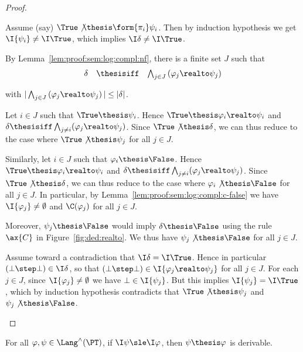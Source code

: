 \begin{proof}
\begin{description}
Assume (say) $\True \not\thesis \form{\pi_i} \psi_i$.
Then by induction hypothesis we get
$\I{\psi_i} \neq \I\True$,
which implies $\I\delta \neq \I\True$.


\item[Case of $\PTbis \arrow \PT$.]
By Lemma~\ref{lem:proof:sem:log:compl:nf},
there is a finite set $J$ such that
\[
\begin{array}{l l l}
  \delta
& \thesisiff
& \bigwedge_{j \in J} \left(\varphi_j \realto \psi_j\right)
\end{array}
\]

\noindent
with
\(
  |\bigwedge_{j \in J} \left(\varphi_j \realto \psi_j\right)|
  \leq
  |\delta|
\).


Let $i \in J$ such that $\True \thesis \psi_i$.
Hence $\True \thesis \varphi_i \realto \psi_i$
and
$\delta \thesisiff \bigwedge_{j \neq i} (\varphi_j \realto \psi_j)$.
Since $\True \not\thesis \delta$,
we can thus reduce to the case where
$\True \not\thesis \psi_j$ for all $j \in J$.

Similarly, let $i \in J$ such that $\varphi_i \thesis \False$.
Hence $\True \thesis \varphi_i \realto \psi_i$
and
$\delta \thesisiff \bigwedge_{j \neq i} (\varphi_j \realto \psi_j)$.
Since $\True \not\thesis \delta$,
we can thus reduce to the case where
$\varphi_i \not\thesis \False$ for all $j \in J$.
In particular, 
by Lemma~\ref{lem:proof:sem:log:compl:c-false}
we have $\I{\varphi_j} \neq \emptyset$ and $\C(\varphi_j)$
for all $j \in J$.

Moreover, 
$\psi_j \thesis \False$
would imply $\delta \thesis \False$
using the rule $\ax{C}$ in Figure~\ref{fig:ded:realto}.
We thus have $\psi_j \not\thesis \False$ for all $j \in J$.

Assume toward a contradiction that $\I\delta = \I\True$.
Hence in particular $(\bot \step \bot) \in \I\delta$,
so that $(\bot \step \bot) \in \I{\varphi_j \realto \psi_j}$
for all $j \in J$.
For each $j \in J$,
since $\I{\varphi_j} \neq \emptyset$
we have $\bot \in \I{\psi_j}$.
But this implies $\I{\psi_j} = \I\True$,
which by induction hypothesis contradicts that
$\True \not\thesis \psi_j$
and
$\psi_j \not\thesis \False$.
\qedhere
\end{description}
\end{proof}

\begin{lemma}
\label{lem:proof:sem:log:compl:ded}
For all $\varphi,\psi \in \Lang^\land(\PT)$,
if $\I\psi \sle \I\varphi$,
then $\psi \thesis \varphi$ is derivable.
\end{lemma}


